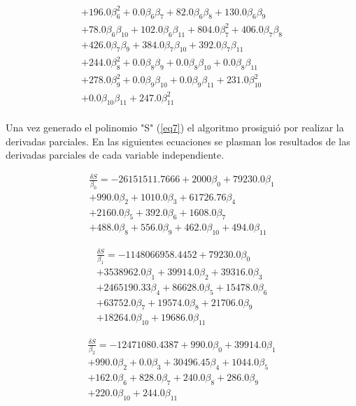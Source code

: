 \documentclass[letterpaper, 10 pt, conference]{ieeeconf}
\begin{document}
\begin{equation}
\begin{split}
+196.0\beta_6^2+0.0\beta_6\beta_7+82.0\beta_6\beta_8+130.0\beta_6\beta_9\\
+78.0\beta_6\beta_{10}+102.0\beta_6\beta_{11}+804.0\beta_7^2+406.0\beta_7\beta_8\\
+426.0\beta_7\beta_9+384.0\beta_7\beta_{10}+392.0\beta_7\beta_{11}\\
+244.0\beta_8^2+0.0\beta_8\beta_9+0.0\beta_8\beta_{10}+0.0\beta_8\beta_{11}\\
+278.0\beta_9^2+0.0\beta_9\beta_{10}+0.0\beta_9\beta_{11}+231.0\beta_{10}^2\\
+0.0\beta_{10}\beta_{11}+247.0\beta_{11}^2
\end{split}
\end{equation}\\

Una vez generado el polinomio "S" (\ref{eq7}) el algoritmo prosiguió por realizar la derivadas parciales. En las siguientes ecuaciones se plasman los resultados de las derivadas parciales de cada variable independiente.

\begin{equation}
\begin{split}
\frac{\delta S}{\beta_0} = -26151511.7666+2000\beta_0+79230.0\beta_1\\
                        +990.0\beta_2+1010.0\beta_3+61726.76\beta_4\\
                        +2160.0\beta_5+392.0\beta_6+1608.0\beta_7\\
                        +488.0\beta_8+556.0\beta_9+462.0\beta_{10}+494.0\beta_{11}
\end{split}
\end{equation}

\begin{equation}
\begin{split}
\frac{\delta S}{\beta_1} = -1148066958.4452+79230.0\beta_0\\
                        +3538962.0\beta_1+39914.0\beta_2+39316.0\beta_3\\
                        +2465190.33\beta_4+86628.0\beta_5+15478.0\beta_6\\
                        +63752.0\beta_7+19574.0\beta_8+21706.0\beta_9\\
                        +18264.0\beta_{10}+19686.0\beta_{11}
\end{split}
\end{equation}

\begin{equation}
\begin{split}
\frac{\delta S}{\beta_2} = -12471080.4387+990.0\beta_0+39914.0\beta_1\\
                        +990.0\beta_2+0.0\beta_3+30496.45\beta_4+1044.0\beta_5\\
                        +162.0\beta_6+828.0\beta_7+240.0\beta_8+286.0\beta_9\\
                        +220.0\beta_{10}+244.0\beta_{11}
\end{split}
\end{equation}
\end{document}

